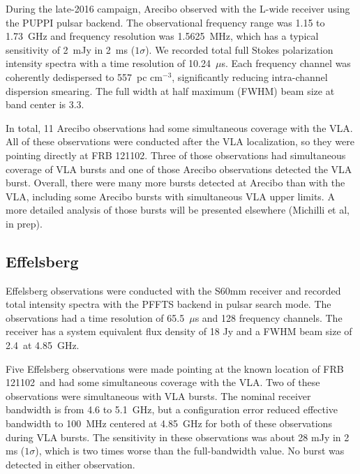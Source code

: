 \documentclass[twocolumn]{aastex61}
\newcommand{\frb}{FRB 121102}
\begin{document}
During the late-2016 campaign, Arecibo observed with the L-wide receiver using the PUPPI pulsar backend. The observational frequency range was 1.15 to 1.73~GHz and frequency resolution was 1.5625~MHz, which has a typical sensitivity of 2~mJy in 2~ms ($1\sigma$). We recorded total full Stokes polarization intensity spectra with a time resolution of 10.24~$\mu$s. Each frequency channel was coherently dedispersed to 557~pc cm$^{-3}$, significantly reducing intra-channel dispersion smearing. The full width at half maximum (FWHM) beam size at band center is 3.3\arcmin.

In total, 11 Arecibo observations had some simultaneous coverage with the VLA. All of these observations were conducted after the VLA localization, so they were pointing directly at \frb. Three of those observations had simultaneous coverage of VLA bursts and one of those Arecibo observations detected the VLA burst. 
Overall, there were many more bursts detected at Arecibo than with the VLA, including some Arecibo bursts with simultaneous VLA upper limits. A more detailed analysis of those bursts will be presented elsewhere (Michilli et al, in prep).

\subsection{Effelsberg}

Effelsberg observations were conducted with the S60mm receiver and recorded total intensity spectra with the PFFTS backend in pulsar search mode. The observations had a time resolution of 65.5~$\mu$s and 128 frequency channels. The receiver has a system equivalent flux density of 18 Jy and a FWHM beam size of 2.4\arcmin\ at 4.85~GHz. 

Five Effelsberg observations were made pointing at the known location of \frb\ and had some simultaneous coverage with the VLA. Two of these observations were simultaneous with VLA bursts. The nominal receiver bandwidth is from 4.6 to 5.1~GHz, but a configuration error reduced effective bandwidth to 100~MHz centered at 4.85~GHz for both of these observations during VLA bursts. The sensitivity in these observations was about 28 mJy in 2 ms ($1\sigma$), which is two times worse than the full-bandwidth value. No burst was detected in either observation.
\end{document}
